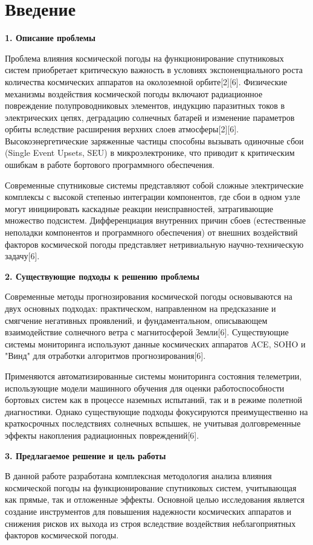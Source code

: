 \chapter*{Введение}

\textbf{1. Описание проблемы}

Проблема влияния космической погоды на функционирование спутниковых систем 
приобретает критическую важность в условиях экспоненциального роста количества 
космических аппаратов на околоземной орбите[2][6]. Физические механизмы воздействия 
космической погоды включают радиационное повреждение полупроводниковых элементов, 
индукцию паразитных токов в электрических цепях, деградацию солнечных батарей и 
изменение параметров орбиты вследствие расширения верхних слоев атмосферы[2][6]. 
Высокоэнергетические заряженные частицы способны вызывать одиночные сбои (Single 
Event Upsets, SEU) в микроэлектронике, что приводит к критическим ошибкам в работе 
бортового программного обеспечения.

Современные спутниковые системы представляют собой сложные электрические комплексы 
с высокой степенью интеграции компонентов, где сбои в одном узле могут инициировать 
каскадные реакции неисправностей, затрагивающие множество подсистем. Дифференциация 
внутренних причин сбоев (естественные неполадки компонентов и программного обеспечения) 
от внешних воздействий факторов космической погоды представляет нетривиальную 
научно-техническую задачу[6].

\textbf{2. Существующие подходы к решению проблемы}

Современные методы прогнозирования космической погоды основываются на двух основных 
подходах: практическом, направленном на предсказание и смягчение негативных проявлений, 
и фундаментальном, описывающем взаимодействие солнечного ветра с магнитосферой Земли[6]. 
Существующие системы мониторинга используют данные космических аппаратов ACE, SOHO и 
"Винд" для отработки алгоритмов прогнозирования[6].

Применяются автоматизированные системы мониторинга состояния телеметрии, использующие 
модели машинного обучения для оценки работоспособности бортовых систем как в процессе 
наземных испытаний, так и в режиме полетной диагностики. Однако существующие подходы 
фокусируются преимущественно на краткосрочных последствиях солнечных вспышек, не 
учитывая долговременные эффекты накопления радиационных повреждений[6].

\textbf{3. Предлагаемое решение и цель работы}

В данной работе разработана комплексная методология анализа влияния космической 
погоды на функционирование спутниковых систем, учитывающая как прямые, так и 
отложенные эффекты. Основной целью исследования является создание инструментов 
для повышения надежности космических аппаратов и снижения рисков их выхода из 
строя вследствие воздействия неблагоприятных факторов космической погоды.

